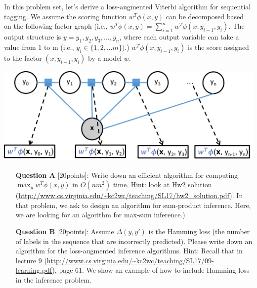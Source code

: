 In this problem set, let's derive a loss-augmented Viterbi algorithm for sequential tagging. We assume the scoring function $w^T \phi(x,y)$ can be decomposed based on the following factor graph (i.e.,  $w^T \phi(x,y)= \sum_{i=1}^{n} w^T\phi(x,y_{i-1}, y_i)$. The output structure is $y=y_1, y_2, y_3, \ldots, y_n$, where each output variable can take a value from 1 to m (i.e., $y_i\in \{1,2,\ldots m\})$.) $w^T\phi(x,y_{i-1}, y_i)$ is the score assigned to the factor $(x,y_{i-1}, y_i)$ by a model $w$.

\includegraphics[width=0.8\linewidth]{factor}



\begin{itemize}
\item[{\bf Question A}][20points]: Write down an efficient algorithm for computing $\max_{y} w^T \phi(x,y)$ in $O(nm^2)$ time. Hint:  look at Hw2 solution (\url{http://www.cs.virginia.edu/~kc2wc/teaching/SL17/hw2_solution.pdf}). In that problem, we ask to design an algorithm for sum-product inference. Here, we are looking for an algorithm for max-sum inference.)

\item[{\bf Question B}][20points]:  Assume $\Delta(y,y')$ is the Hamming loss (the number of labels in the sequence that are incorrectly predicted). Please write down an algorithm for the loss-augmented inference algorithms. Hint: Recall that in lecture 9 (\url{http://www.cs.virginia.edu/~kc2wc/teaching/SL17/09-learning.pdf}), page 61. We show an example of how to include Hamming loss in the inference problem. 

\end{itemize}


